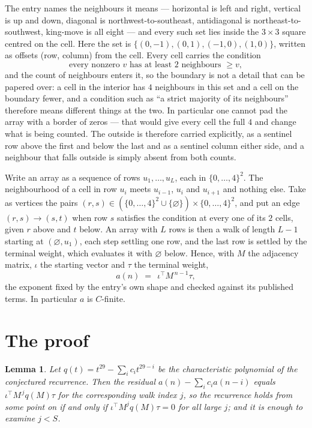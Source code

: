 \documentclass[11pt,a4paper]{article}
\theoremstyle{plain}
\newtheorem{lemma}[theorem]{Lemma}
\theoremstyle{definition}
\begin{document}
The entry names the neighbours it means --- horizontal is left and right, vertical is up and
down, diagonal is northwest-to-southeast, antidiagonal is northeast-to-southwest, king-move is
all eight --- and every such set lies inside the $3\times3$ square centred on the cell. Here
the set is $\{(0,-1), (0,1), (-1,0), (1,0)\}$, written as offsets (row, column) from the cell. Every cell carries
the condition
\[
\text{every nonzero }v\text{ has at least 2 neighbours }\ge v,
\]
and the count of neighbours enters it, so the boundary is not a detail that can be papered
over: a cell in the interior has $4$ neighbours in this set and a cell on the boundary
fewer, and a condition such as ``a strict majority of its neighbours'' therefore means
different things at the two. In particular one cannot pad the array with a border of zeros ---
that would give every cell the full $4$ and change what is being counted. The outside is
therefore carried
explicitly, as a sentinel row above the first and below the last and as a sentinel column
either side, and a neighbour that falls outside is simply absent from both counts.

Write an array as a sequence of rows $u_1,\dots,u_L$, each in
$\{0,\dots,4\}^{2}$. The neighbourhood of a cell in row $u_i$ meets $u_{i-1}$,
$u_i$ and $u_{i+1}$ and nothing else. Take as vertices the pairs
$(r,s)\in(\{0,\dots,4\}^{2}\cup\{\varnothing\})\times\{0,\dots,4\}^{2}$,
and put an edge $(r,s)\to(s,t)$ when row $s$ satisfies the condition at every one of its
$2$ cells, given $r$ above and $t$ below. An array with $L$ rows is then a walk of length
$L-1$ starting at $(\varnothing,u_1)$, each step settling one row, and the last row is
settled by the terminal weight, which evaluates it with $\varnothing$ below. Hence,
with $M$ the adjacency matrix, $\iota$ the starting vector and $\tau$ the terminal weight,
\[
a(n)\;=\;\,\iota^{\!\top}M^{\,n-1}\tau ,
\]
the exponent fixed by the entry's own shape and checked against its published terms. In
particular $a$ is $C$-finite.

\section{The proof}

\begin{lemma}\label{lem:crit}
Let $q(t)=t^{29}-\sum_i c_it^{29-i}$ be the characteristic polynomial of the
conjectured recurrence. Then the residual $a(n)-\sum_ic_ia(n-i)$ equals
$\iota^{\!\top}M^{\,j}q(M)\tau$ for the corresponding walk index $j$, so the
recurrence holds from some point on if and only if $\iota^{\!\top}M^{j}q(M)\tau=0$ for all
large $j$; and it is enough to examine $j<S$.
\end{lemma}
\end{document}
